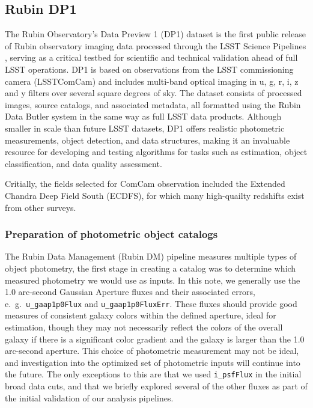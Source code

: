 \subsection{Rubin DP1}
\label{sec:data:dp1}

The Rubin Observatory’s Data Preview 1 (DP1) dataset is the first public release of Rubin observatory imaging data processed through the LSST Science Pipelines \cite{10.71929/rubin/2570325}, serving as a critical testbed for scientific and technical validation ahead of full LSST operations.  DP1 is based on observations from the LSST commissioning camera (LSSTComCam) and includes multi-band optical imaging in u, g, r, i, z and y filters over several square degrees of sky.  The dataset consists of processed images, source catalogs, and associated metadata, all formatted using the Rubin Data Butler system\cite{DMTN-229} in the same way as full LSST data products.  Although smaller in scale than future LSST datasets, DP1 offers realistic photometric measurements, object detection, and data structures, making it an invaluable resource for developing and testing algorithms for tasks such as \photoz estimation, object classification, and data quality assessment.

Critially, the fields selected for ComCam observation included the Extended Chandra Deep Field South (ECDFS), for which many high-quailty redshifts exist from other surveys. 


\subsubsection{Preparation of photometric object catalogs}
\label{sec:data:dp1:preparation}

The Rubin Data Management (Rubin DM) pipeline measures multiple types of object photometry, the first stage in creating a \photoz catalog was to determine which measured photometry we would use as inputs.  In this note, we generally use the 1.0 arc-second Gaussian Aperture fluxes and their associated errors, e.~g.~\texttt{u\_gaap1p0Flux} and \texttt{u\_gaap1p0FluxErr}.  These fluxes should provide good measures of consistent galaxy colors within the defined aperture, ideal for \photoz estimation, though they may not necessarily reflect the colors of the overall galaxy if there is a significant color gradient and the galaxy is larger than the 1.0 arc-second aperture.  This choice of photometric measurement may not be ideal, and investigation into the optimized set of photometric inputs will continue into the future.   The only exceptions to this are that we used \texttt{i\_psfFlux} in the initial broad data cuts, and that we briefly explored several of the other fluxes as part of the initial validation of our \photoz analysis pipelines. 

